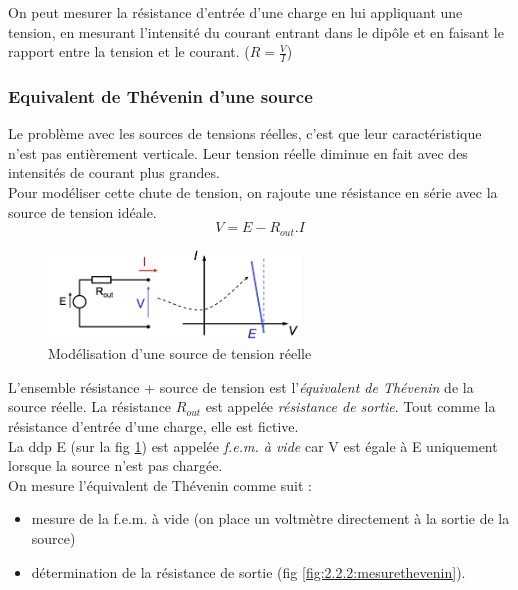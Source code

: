 \documentclass[a4paper]{article}
\begin{document}
    On peut mesurer la résistance d'entrée d'une charge en lui appliquant une tension,
    en mesurant l'intensité du courant entrant dans le dipôle et en faisant
    le rapport entre la tension et le courant. ($R = \frac{V}{I} $)

    \subsubsection{Equivalent de Thévenin d'une source}
    Le problème avec les sources de tensions réelles, c'est que leur caractéristique
    n'est pas entièrement verticale. Leur tension réelle diminue en fait avec
    des intensités de courant plus grandes.\\

    Pour modéliser cette chute de tension, on rajoute une résistance en série
    avec la source de tension idéale. $$V = E - R_{out}.I$$
    \begin{figure}[H]
        \begin{center}
            \includegraphics[width=0.6\textwidth]{fig/2_eqtheveninsource.png}
            \caption{Modélisation d'une source de tension réelle}
            \label{fig:2.2.2:eqtheveninsource}
        \end{center}
    \end{figure}

    L'ensemble résistance + source de tension est l'\textit{équivalent de Thévenin}
    de la source réelle. La résistance $R_{out}$ est appelée \textit{résistance
    de sortie}. Tout comme la résistance d'entrée d'une charge, elle est fictive.\\

    La ddp E (sur la fig \ref{fig:2.2.2:eqtheveninsource}) est appelée \textit{
    f.e.m. à vide} car V est égale à E uniquement lorsque la source n'est pas chargée.\\

    On mesure l'équivalent de Thévenin comme suit :
    \begin{itemize}
        \item mesure de la f.e.m. à vide (on place un voltmètre directement à la sortie de la source)
        \item détermination de la résistance de sortie (fig \ref{fig:2.2.2:mesurethevenin}).
    \end{itemize}
\end{document}
